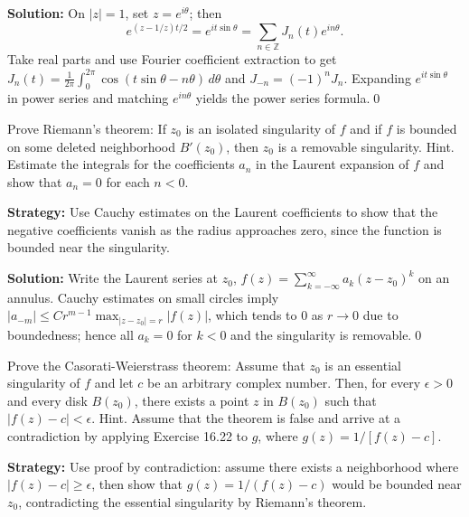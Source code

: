 \bigskip\noindent\textbf{Solution:}
On $|z|=1$, set $z=e^{i\theta}$; then
\[e^{(z-1/z)t/2}=e^{i t\sin\theta}=\sum_{n\in\mathbb Z} J_n(t)e^{in\theta}.
\]
Take real parts and use Fourier coefficient extraction to get $J_n(t)=\frac{1}{2\pi}\int_0^{2\pi}\cos(t\sin\theta-n\theta)\,d\theta$ and $J_{-n}=(-1)^nJ_n$. Expanding $e^{i t\sin\theta}$ in power series and matching $e^{in\theta}$ yields the power series formula.\qed


\begin{problembox}
\begin{problemstatement}
Prove Riemann's theorem: If \( z_0 \) is an isolated singularity of \( f \) and if \( f \) is bounded on some deleted neighborhood \( B'(z_0) \), then \( z_0 \) is a removable singularity. Hint. Estimate the integrals for the coefficients \( a_n \) in the Laurent expansion of \( f \) and show that \( a_n = 0 \) for each \( n < 0 \).
\end{problemstatement}
\end{problembox}

\noindent\textbf{Strategy:} Use Cauchy estimates on the Laurent coefficients to show that the negative coefficients vanish as the radius approaches zero, since the function is bounded near the singularity.

\bigskip\noindent\textbf{Solution:}
Write the Laurent series at $z_0$, $f(z)=\sum_{k=-\infty}^{\infty} a_k(z-z_0)^k$ on an annulus. Cauchy estimates on small circles imply $|a_{-m}|\le C r^{m-1}\max_{|z-z_0|=r}|f(z)|$, which tends to $0$ as $r\to0$ due to boundedness; hence all $a_{k}=0$ for $k<0$ and the singularity is removable.\qed


\begin{problembox}
\begin{problemstatement}
Prove the Casorati-Weierstrass theorem: Assume that \( z_0 \) is an essential singularity of \( f \) and let \( c \) be an arbitrary complex number. Then, for every \( \epsilon > 0 \) and every disk \( B(z_0) \), there exists a point \( z \) in \( B(z_0) \) such that \( |f(z) - c| < \epsilon \). Hint. Assume that the theorem is false and arrive at a contradiction by applying Exercise 16.22 to \( g \), where \( g(z) = 1/[f(z) - c] \).
\end{problemstatement}
\end{problembox}

\noindent\textbf{Strategy:} Use proof by contradiction: assume there exists a neighborhood where \( |f(z) - c| \geq \epsilon \), then show that \( g(z) = 1/(f(z) - c) \) would be bounded near \( z_0 \), contradicting the essential singularity by Riemann's theorem.

